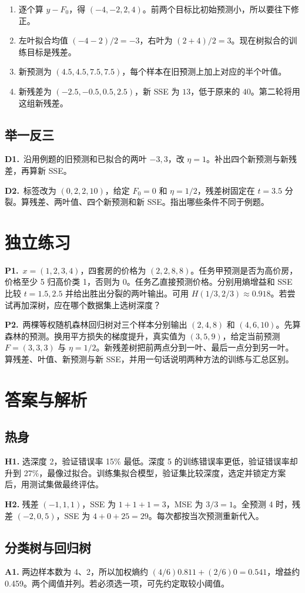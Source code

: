 \documentclass[UTF8,a4paper,11pt]{ctexart}
\newcommand{\CompactQuestion}[2]{\par\noindent\textbf{#1.}\ #2\par\vspace{.8em}}
\begin{document}
\begin{enumerate}
\item 逐个算 $y-F_0$，得 $(-4,-2,2,4)$。前两个目标比初始预测小，所以要往下修正。
\item 左叶拟合均值 $(-4-2)/2=-3$，右叶为 $(2+4)/2=3$。现在树拟合的训练目标是残差。
\item 新预测为 $(4.5,4.5,7.5,7.5)$，每个样本在旧预测上加上对应的半个叶值。
\item 新残差为 $(-2.5,-0.5,0.5,2.5)$，新 SSE 为 $13$，低于原来的 $40$。第二轮将用这组新残差。
\end{enumerate}
\subsection{举一反三}
\CompactQuestion{D1}{沿用例题的旧预测和已拟合的两叶 $-3,3$，改 $\eta=1$。补出四个新预测与新残差，再算新 SSE。}
\CompactQuestion{D2}{标签改为 $(0,2,2,10)$，给定 $F_0=0$ 和 $\eta=1/2$，残差树固定在 $t=3.5$ 分裂。算残差、两叶值、四个新预测和新 SSE。指出哪些条件不同于例题。}
\section{独立练习}
\CompactQuestion{P1}{$x=(1,2,3,4)$，四套房的价格为 $(2,2,8,8)$。任务甲预测是否为高价房，价格至少 5 归高价类 1，否则为 0。任务乙直接预测价格。分别用熵增益和 SSE 比较 $t=1.5,2.5$ 并给出胜出分裂的两叶输出。可用 $H(1/3,2/3)\approx0.918$。若尝试再加深树，应在哪个数据集上选树深度？}
\CompactQuestion{P2}{两棵等权随机森林回归树对三个样本分别输出 $(2,4,8)$ 和 $(4,6,10)$。先算森林的预测。换用平方损失的梯度提升，真实值为 $(3,5,9)$，给定当前预测 $F=(3,3,3)$ 与 $\eta=1/2$。新残差树把前两点分到一叶、最后一点分到另一叶。算残差、叶值、新预测与新 SSE，并用一句话说明两种方法的训练与汇总区别。}
\clearpage
\section{答案与解析}
\subsection{热身}
\textbf{H1.} 选深度 2，验证错误率 15\% 最低。深度 5 的训练错误率更低，验证错误率却升到 27\%，最像过拟合。训练集拟合模型，验证集比较深度，选定并锁定方案后，用测试集做最终评估。

\textbf{H2.} 残差 $(-1,1,1)$，SSE 为 $1+1+1=3$，MSE 为 $3/3=1$。全预测 4 时，残差 $(-2,0,5)$，SSE 为 $4+0+25=29$。每次都按当次预测重新代入。

\subsection{分类树与回归树}
\textbf{A1.} 两边样本数为 4、2，所以加权熵约 $(4/6)0.811+(2/6)0=0.541$，增益约 0.459。两个阈值并列。若必须选一项，可先约定取较小阈值。
\end{document}
